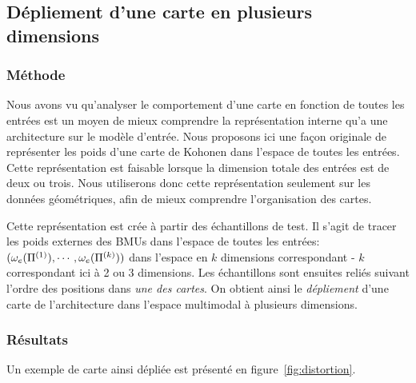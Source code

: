 \subsection{Dépliement d'une carte en plusieurs dimensions}

\subsubsection{Méthode}
Nous avons vu qu'analyser le comportement d'une carte en fonction de toutes les entrées est un moyen de mieux comprendre la représentation interne qu'a une architecture sur le modèle d'entrée.
Nous proposons ici une façon originale de représenter les poids d'une carte de Kohonen dans l'espace de toutes les entrées. Cette représentation est faisable lorsque la dimension totale des entrées est de deux ou trois. Nous utiliserons donc cette représentation seulement sur les données géométriques, afin de mieux comprendre l'organisation des cartes.

Cette représentation est crée à partir des échantillons de test. Il s'agit de tracer les poids externes des BMUs dans l'espace de toutes les entrées: $(\omega_e(\Pi^{({1})}),\cdots,\omega_e(\Pi^{({k})}))$ dans l'espace en $k$ dimensions correspondant - $k$ correspondant ici à 2 ou 3 dimensions. Les échantillons sont ensuites reliés suivant l'ordre des positions dans \emph{une des cartes}. On obtient ainsi le \emph{dépliement} d'une carte de l'architecture dans l'espace multimodal à plusieurs dimensions. 

\subsubsection{Résultats}

Un exemple de carte ainsi dépliée est présenté en figure~\ref{fig:distortion}.

